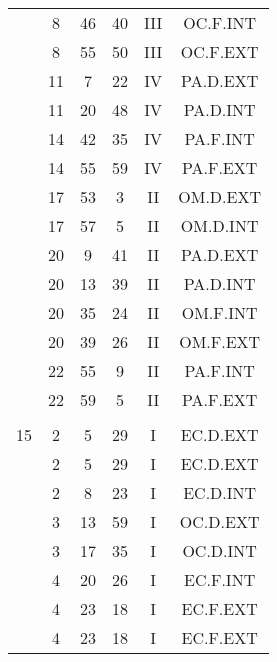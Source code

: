 \documentclass[12pt, a4paper]{article}
\begin{document}
\begin{multicols}{3}
{\begin{tabular}{c c c c c c}
	 	 	 	 & 8 & 46 & 40 & III & OC.F.INT\\%
	 	 	 	 & 8 & 55 & 50 & III & OC.F.EXT\\%
	 	 	 	 & 11 & 7 & 22 & IV & PA.D.EXT\\%
	 	 	 	 & 11 & 20 & 48 & IV & PA.D.INT\\%
	 	 	 	 & 14 & 42 & 35 & IV & PA.F.INT\\%
	 	 	 	 & 14 & 55 & 59 & IV & PA.F.EXT\\%
	 	 	 	 & 17 & 53 & 3 & II & OM.D.EXT\\%
	 	 	 	 & 17 & 57 & 5 & II & OM.D.INT\\%
	 	 	 	 & 20 & 9 & 41 & II & PA.D.EXT\\%
	 	 	 	 & 20 & 13 & 39 & II & PA.D.INT\\%
	 	 	 	 & 20 & 35 & 24 & II & OM.F.INT\\%
	 	 	 	 & 20 & 39 & 26 & II & OM.F.EXT\\%
	 	 	 	 & 22 & 55 & 9 & II & PA.F.INT\\%
	 	 	 	 & 22 & 59 & 5 & II & PA.F.EXT\\%
	 	 	 	 & & & & & \\%
	 	 	 	15 & 2 & 5 & 29 & I & EC.D.EXT\\%
	 	 	 	 & 2 & 5 & 29 & I & EC.D.EXT\\%
	 	 	 	 & 2 & 8 & 23 & I & EC.D.INT\\%
	 	 	 	 & 3 & 13 & 59 & I & OC.D.EXT\\%
	 	 	 	 & 3 & 17 & 35 & I & OC.D.INT\\%
	 	 	 	 & 4 & 20 & 26 & I & EC.F.INT\\%
	 	 	 	 & 4 & 23 & 18 & I & EC.F.EXT\\%
	 	 	 	 & 4 & 23 & 18 & I & EC.F.EXT\\%

\end{tabular}}
\end{multicols}
\end{document}
